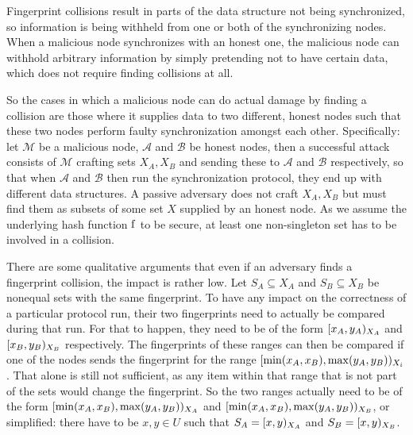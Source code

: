 Fingerprint collisions result in parts of the data structure not being synchronized, so information is being withheld from one or both of the synchronizing nodes. When a malicious node synchronizes with an honest one, the malicious node can withhold arbitrary information by simply pretending not to have certain data, which does not require finding collisions at all.

So the cases in which a malicious node can do actual damage by finding a collision are those where it supplies data to two different, honest nodes such that these two nodes perform faulty synchronization amongst each other. Specifically: let $\mathcal{M}$ be a malicious node, $\mathcal{A}$ and $\mathcal{B}$ be honest nodes, then a successful attack consists of $\mathcal{M}$ crafting sets $X_A, X_B$ and sending these to $\mathcal{A}$ and $\mathcal{B}$ respectively, so that when $\mathcal{A}$ and $\mathcal{B}$ then run the synchronization protocol, they end up with different data structures. A passive adversary does not craft $X_A, X_B$ but must find them as subsets of some set $X$ supplied by an honest node. As we assume the underlying hash function $\operatorname{f}$ to be secure, at least one non-singleton set has to be involved in a collision.

There are some qualitative arguments that even if an adversary finds a fingerprint collision, the impact is rather low. Let $S_A \subseteq X_A$ and $S_B \subseteq X_B$ be nonequal sets with the same fingerprint. To have any impact on the correctness of a particular protocol run, their two fingerprints need to actually be compared during that run. For that to happen, they need to be of the form $[{x_A},{y_A})_{X_A}$ and $[{x_B},{y_B})_{X_B}$ respectively. The fingerprints of these ranges can then be compared if one of the nodes sends the fingerprint for the range $[{\min(x_A, x_B)},{\max(y_A, y_B)})_{X_i}$. That alone is still not sufficient, as any item within that range that is not part of the sets would change the fingerprint. So the two ranges actually need to be of the form $[{\min(x_A, x_B)},{\max(y_A, y_B)})_{X_A}$ and $[{\min(x_A, x_B)},{\max(y_A, y_B)})_{X_B}$, or simplified: there have to be $x, y \in U$ such that $S_A = [{x},{y})_{X_A}$ and $S_B = [{x},{y})_{X_B}$.

